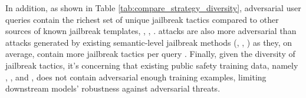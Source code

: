 In addition, as shown in Table \ref{tab:compare_strategy_diversity}, \itwshort adversarial user queries contain the richest set of unique jailbreak tactics compared to other sources of known jailbreak templates, \ie \danshort \citep{doanytingnow}, \trustllm \citep{sun2024trustllm}, \decodingtrust \citep{wang2023decodingtrust}. \itwshort attacks are also more adversarial than attacks generated by existing semantic-level jailbreak methods (\ie \pair, \tap, \pap) as they, on average, contain more jailbreak tactics per query \citep{pair, tap, pap}. 
Finally, given the diversity of \itwshort jailbreak tactics, it's concerning that existing public safety training data, namely \hhrlhf \citep{hh-rlhf}, \safellamashort \citep{safetytuned_llama}, and \saferlhf \citep{safe-rlhf}, does not contain adversarial enough training examples, limiting downstream models' robustness against adversarial threats. 

